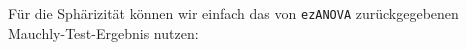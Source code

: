 \documentclass[
]{book}
\newenvironment{Shaded}{\begin{snugshade}}{\end{snugshade}}
\newcommand{\AttributeTok}[1]{\textcolor[rgb]{0.77,0.63,0.00}{#1}}
\newcommand{\NormalTok}[1]{#1}
\newcommand{\SpecialCharTok}[1]{\textcolor[rgb]{0.00,0.00,0.00}{#1}}
\newcommand{\StringTok}[1]{\textcolor[rgb]{0.31,0.60,0.02}{#1}}
\begin{document}
Für die Sphärizität können wir einfach das von \texttt{ezANOVA} zurückgegebenen Mauchly-Test-Ergebnis nutzen:

\begin{Shaded}
\end{Shaded}

 
  \providecommand{\huxb}[2]{\arrayrulecolor[RGB]{#1}\global\arrayrulewidth=#2pt}
  \providecommand{\huxvb}[2]{\color[RGB]{#1}\vrule width #2pt}
  \providecommand{\huxtpad}[1]{\rule{0pt}{#1}}
  \providecommand{\huxbpad}[1]{\rule[-#1]{0pt}{#1}}
\end{document}
